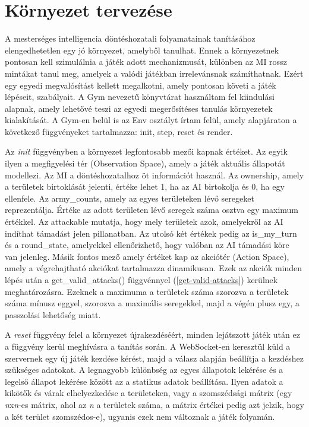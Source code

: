 \documentclass[
]{thesis-ekf}
\theoremstyle{definition}
\theoremstyle{remark}
\begin{document}
	\section{Környezet tervezése}
	\label{környezet-tervezése}
	
	A mesterséges intelligencia döntéshozatali folyamatainak tanításához elengedhetetlen egy jó környezet, amelyből tanulhat. Ennek a környezetnek pontosan kell szimulálnia a játék adott mechanizmusát, különben az MI rossz mintákat tanul meg, amelyek a valódi játékban irrelevánsnak számíthatnak. Ezért egy egyedi megvalósítást kellett megalkotni, amely pontosan követi a játék lépéseit, szabályait. A Gym nevezetű könyvtárat használtam fel kiindulási alapnak, amely lehetővé teszi az egyedi megerősítéses tanulás környezetek kialakítását. A Gym-en belül is az Env osztályt írtam felül, amely alapjáraton a következő függvényeket tartalmazza: init, step, reset és render. 
	
	Az \emph{init} függvényben a környezet legfontosabb mezői kapnak értéket. Az egyik ilyen a megfigyelési tér (Observation Space), amely a játék aktuális állapotát modellezi. Az MI a döntéshozatalhoz öt információt használ. Az ownership, amely a területek birtoklását jelenti, értéke lehet 1, ha az AI birtokolja és 0, ha egy ellenfele. Az army\_counts, amely az egyes területeken lévő seregeket reprezentálja. Értéke az adott területen lévő seregek száma osztva egy maximum értékkel. Az attackable mutatja, hogy mely területek azok, amelyekről az AI indíthat támadást jelen pillanatban. Az utolsó két értékek pedig az is\_my\_turn és a round\_state, amelyekkel ellenőrizhető, hogy valóban az AI támadási köre van jelenleg. Másik fontos mező amely értéket kap az akciótér (Action Space), amely a végrehajtható akciókat tartalmazza dinamikusan. Ezek az akciók minden lépés után a get\_valid\_attacks() függvénnyel (\ref{get-valid-attacks}) kerülnek meghatározásra. Ezeknek a maximuma a területek száma szorozva a területek száma mínusz eggyel, szorozva a maximális seregekkel, majd a végén plusz egy, a passzolási lehetőség miatt. 
	
	
	
	A \emph{reset} függvény felel a környezet újrakezdéséért, minden lejátszott játék után ez a függvény kerül meghívásra a tanítás során. A WebSocket-en keresztül küld a szervernek egy új játék kezdése kérést, majd a válasz alapján beállítja a kezdéshez szükséges adatokat. A legnagyobb különbség az egyes állapotok lekérése és a legelső állapot lekérése között az a statikus adatok beállítása. Ilyen adatok a kikötők és várak elhelyezkedése a területeken, vagy a szomszédsági mátrix (egy \emph{n}x\emph{n}-es mátrix, ahol az \emph{n} a területek száma, a mátrix értékei pedig azt jelzik, hogy a két terület szomszédos-e), ugyanis ezek nem változnak a játék folyamán.
	
\end{document}
